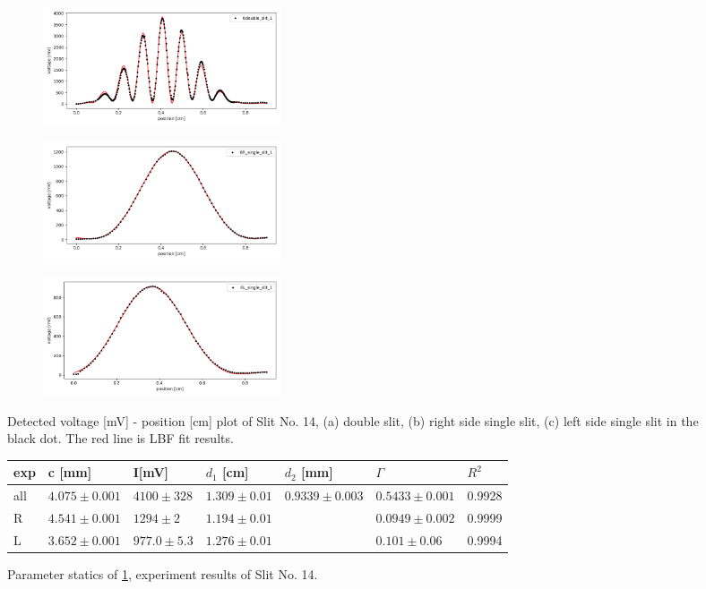 \documentclass{article}
\begin{document}
\begin{figure}[H]
    \begin{subfigure}[b]{7cm}
        \centering
        \includegraphics[width=7cm]{../results/laser(6_double_slit)_modified_fig.png}
        \caption{}
    \end{subfigure}
    \hfill
    \begin{subfigure}[b]{7cm}
      \centering
      \includegraphics[width=7cm]{../results/laser(6_R_single_slit)_modified_fig.png}
      \caption{}
  \end{subfigure}
  \hfill
  \centering
  \begin{subfigure}[b]{7cm}
    \centering
    \includegraphics[width=7cm]{../results/laser(6_L_single_slit)_modified_fig.png}
    \caption{}
  \end{subfigure}
  \hfill
    \caption{Detected voltage [mV] - position [cm] plot of Slit No. 14, (a) double slit, (b) right side single slit, (c) left side single slit in the black dot.
        The red line is LBF fit results.
     }
    \label{fig: 14_laser_plot}
  \end{figure}

\begin{figure}[H]
    \begin{tabular}{  m{0.6cm}|m{2cm}|m{1.7cm}|m{2cm}|m{2.3cm}|m{2.3cm}|m{1cm} } 
        exp & c [mm]& I[mV] & $d_1$ [cm] & $d_2$ [mm] & $\Gamma$ & $R^2$ \\ \hline \hline
        all& $4.075 \pm 0.001$& $4100 \pm 328$& $1.309 \pm 0.01$& $0.9339 \pm 0.003$& $0.5433 \pm 0.001$& 0.9928\\ \hline 
        R& $ 4.541 \pm 0.001$& $1294 \pm 2$& $ 1.194 \pm 0.01$& & $ 0.0949 \pm 0.002$& 0.9999\\ \hline 
        L& $ 3.652 \pm 0.001$& $977.0 \pm 5.3$& $1.276 \pm 0.01$&& $ 0.101 \pm 0.06$& 0.9994\\ \hline 
    \end{tabular}
    \caption{Parameter statics of \ref{fig: 14_laser_plot}, experiment results of Slit No. 14.}
    \label{fig: 14_laser_parmeters}
\end{figure}
\end{document}
